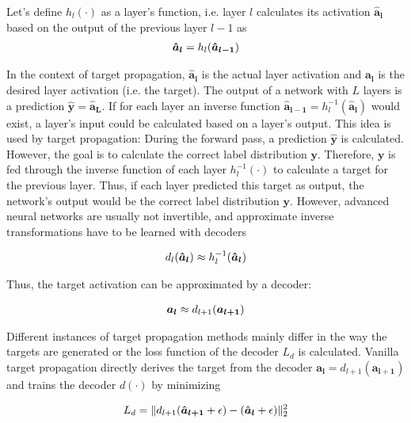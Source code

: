 Let's define $h_l(\cdot)$ as a layer's function, i.e. layer $l$ calculates its activation $\boldsymbol{\hat{a}_l}$ based on the output of the previous layer $l-1$ as
\begin{align}\eqlbl{tp0}
	\boldsymbol{\hat{a}_l} = h_l(\boldsymbol{\hat{a}_{l-1}})
\end{align}

In the context of target propagation, $\boldsymbol{\hat{a}_l}$ is the actual layer activation and $\boldsymbol{a_l}$ is the desired layer activation (i.e. the target).
The output of a network with $L$ layers is a prediction $\boldsymbol{\hat{y}} = \boldsymbol{\hat{a}_L}$. If for each layer an inverse function $\boldsymbol{\hat{a}_{l-1}} = h_l^{-1}(\boldsymbol{\hat{a}_l})$ would exist, a layer's input could be calculated based on a layer's output. 
This idea is used by target propagation: During the forward pass, a prediction $\boldsymbol{\hat{y}}$ is calculated. However, the goal is to calculate the correct label distribution $\boldsymbol{y}$. Therefore, $\boldsymbol{y}$ is fed through the inverse function of each layer $h_l^{-1}(\cdot)$ to calculate a target for the previous layer.
Thus, if each layer predicted this target as output, the network's output would be the correct label distribution $\boldsymbol{y}$.
However, advanced neural networks are usually not invertible, and approximate inverse transformations have to be learned with decoders

\begin{align}\eqlbl{tp3}
	d_l(\boldsymbol{\hat{a}_l}) \approx  h_l^{-1}(\boldsymbol{\hat{a}_l})
\end{align}

Thus, the target activation can be approximated by a decoder:

\begin{align}\eqlbl{tp4}
	\boldsymbol{a_{l}} \approx d_{l+1}(\boldsymbol{a_{l+1}}) 
\end{align}



Different instances of target propagation methods mainly differ in the way the targets are generated or the loss function of the decoder $L_{d}$ is calculated.
Vanilla target propagation  directly derives the target from the decoder $\boldsymbol{a_{l}} = d_{l+1}(\boldsymbol{a_{l+1}}) $ and trains the decoder $d(\cdot)$ by minimizing

\begin{align}\eqlbl{tp5}
	L_{d} = \lVert d_{l+1}(\boldsymbol{\hat{a}_{l+1}} + \epsilon) - (\boldsymbol{\hat{a}_l} + \epsilon) \rVert_2^2
\end{align}

